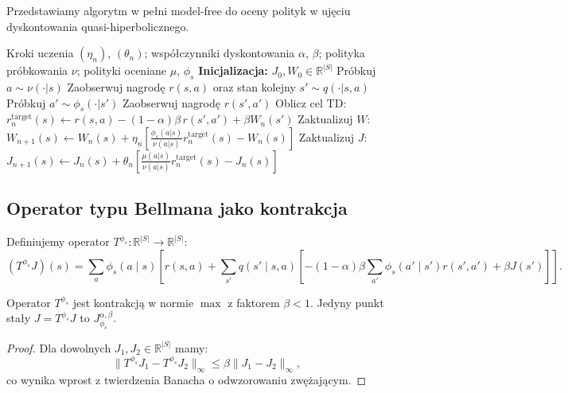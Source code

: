 Przedstawiamy algorytm w pełni model-free do oceny polityk w ujęciu dyskontowania quasi-hiperbolicznego.

\begin{algorithm}[H]
\caption{Model-Free Policy Evaluation for QH Discounting}
\label{alg:policy-eval}
\begin{algorithmic}[1]
\REQUIRE Kroki uczenia $(\eta_n)$, $(\theta_n)$; współczynniki dyskontowania $\alpha$, $\beta$; polityka próbkowania $\nu$; polityki oceniane $\mu$, $\phi_s$
\STATE \textbf{Inicjalizacja:} $J_0, W_0 \in \mathbb{R}^{|S|}$
\STATE Próbkuj $a \sim \nu(\cdot|s)$
\STATE Zaobserwuj nagrodę $r(s, a)$ oraz stan kolejny $s' \sim q(\cdot|s, a)$
\STATE Próbkuj $a' \sim \phi_s(\cdot|s')$
\STATE Zaobserwuj nagrodę $r(s', a')$
\STATE Oblicz cel TD: $r^{\text{target}}_n(s) \leftarrow r(s, a) - (1 - \alpha)\beta \, r(s', a') + \beta W_n(s')$
\STATE Zaktualizuj $W$: $W_{n+1}(s) \leftarrow W_n(s) + \eta_n \left[ \frac{\phi_s(a|s)}{\nu(a|s)} r^{\text{target}}_n(s) - W_n(s) \right]$
\STATE Zaktualizuj $J$: $J_{n+1}(s) \leftarrow J_n(s) + \theta_n \left[ \frac{\mu(a|s)}{\nu(a|s)} r^{\text{target}}_n(s) - J_n(s) \right]$
\ENDFOR
\ENDFOR
\end{algorithmic}
\end{algorithm}

\subsection{Operator typu Bellmana jako kontrakcja}

Definiujemy operator $T^{\phi_s}: \mathbb{R}^{|S|} \to \mathbb{R}^{|S|}$:
\begin{equation}
(T^{\phi_s} J)(s) = \sum_a \phi_s(a\mid s) \left[ r(s, a) + \sum_{s'} q(s'\mid s, a) \left[ -(1 - \alpha)\beta \sum_{a'} \phi_s(a'\mid s') r(s', a') + \beta J(s') \right] \right].
\end{equation}

\begin{theorem}
\label{thm:bellman-contraction}
Operator $T^{\phi_s}$ jest kontrakcją w normie $\max$ z faktorem $\beta < 1$. Jedyny punkt stały $J = T^{\phi_s} J$ to $J^{\alpha, \beta}_{\phi_s}$.
\end{theorem}

\begin{proof}
Dla dowolnych $J_1, J_2 \in \mathbb{R}^{|S|}$ mamy:
\[
\|T^{\phi_s} J_1 - T^{\phi_s} J_2\|_\infty \leq \beta \|J_1 - J_2\|_\infty,
\]
co wynika wprost z twierdzenia Banacha o odwzorowaniu zwężającym.
\end{proof}

